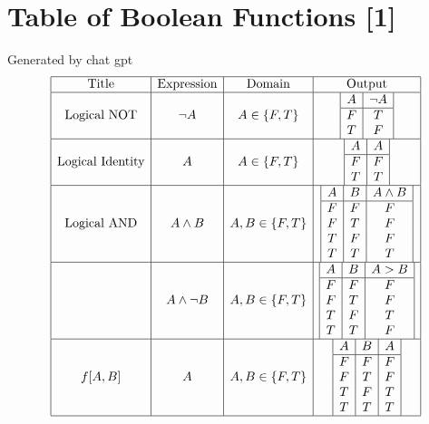 \documentclass[11pt]{article}
\begin{document}
\section{Table of Boolean Functions [1]}
Generated by chat gpt
\[
\begin{array}{|c|c|c|c|}
\hline
\text{Title} & \text{Expression} & \text{Domain} & \text{Output} \\
\hline
\text{Logical NOT} & \neg A & A \in \{F, T\} & \begin{array}{|c|c|}
A & \neg A \\
\hline
F & T \\
T & F \\
\end{array} \\
\hline
\text{Logical Identity} & A & A \in \{F, T\} & \begin{array}{|c|c|}
A & A \\
\hline
F & F \\
T & T \\
\end{array} \\
\hline
\text{Logical AND} & A \land B & A, B \in \{F, T\} & \begin{array}{|c|c|c|}
A & B & A \land B \\
\hline
F & F & F \\
F & T & F \\
T & F & F \\
T & T & T \\
\end{array} \\
\hline
\text{} & A \land \lnot B & A, B \in \{F, T\} & \begin{array}{|c|c|c|}
A & B & A > B \\
\hline
F & F & F \\
F & T & F \\
T & F & T \\
T & T & F \\
\end{array} \\
\hline
f[A, B] & A & A, B \in \{F, T\} & \begin{array}{|c|c|c|}
A & B & A \\
\hline
F & F & F \\
F & T & F \\
T & F & T \\
T & T & T \\
\end{array} \\
\hline
\end{array}
\]
\end{document}

